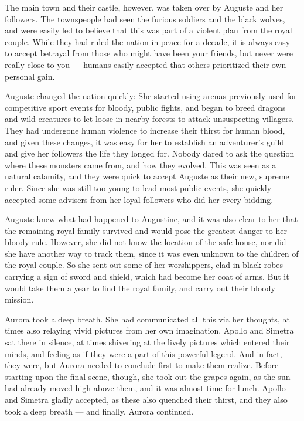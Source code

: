 The main town and their castle, however, was taken over by Auguste and her followers. The townspeople had seen the furious soldiers and the black wolves, and were easily led to believe that this was part of a violent plan from the royal couple. While they had ruled the nation in peace for a decade, it is always easy to accept betrayal from those who might have been your friends, but never were really close to you --- humans easily accepted that others prioritized their own personal gain.

Auguste changed the nation quickly: She started using arenas previously used for competitive sport events for bloody, public fights, and began to breed dragons and wild creatures to let loose in nearby forests to attack unsuspecting villagers. They had undergone human violence to increase their thirst for human blood, and given these changes, it was easy for her to establish an adventurer's guild and give her followers the life they longed for. Nobody dared to ask the question where these monsters came from, and how they evolved. This was seen as a natural calamity, and they were quick to accept Auguste as their new, supreme ruler. Since she was still too young to lead most public events, she quickly accepted some advisers from her loyal followers who did her every bidding.

Auguste knew what had happened to Augustine, and it was also clear to her that the remaining royal family survived and would pose the greatest danger to her bloody rule. However, she did not know the location of the safe house, nor did she have another way to track them, since it was even unknown to the children of the royal couple. So she sent out some of her worshippers, clad in black robes carrying a sign of sword and shield, which had become her coat of arms. But it would take them a year to find the royal family, and carry out their bloody mission.

\fancybreaker{}

Aurora took a deep breath. She had communicated all this via her thoughts, at times also relaying vivid pictures from her own imagination. Apollo and Simetra sat there in silence, at times shivering at the lively pictures which entered their minds, and feeling as if they were a part of this powerful legend. And in fact, they were, but Aurora needed to conclude first to make them realize. Before starting upon the final scene, though, she took out the grapes again, as the sun had already moved high above them, and it was almost time for lunch. Apollo and Simetra gladly accepted, as these also quenched their thirst, and they also took a deep breath --- and finally, Aurora continued.

